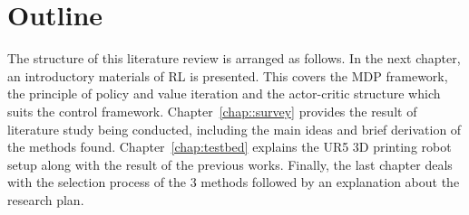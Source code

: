 \section{Outline}

The structure of this literature review is arranged as follows. In the next chapter, an introductory materials of \acs{RL} is presented. This covers the \ac{MDP} framework, the principle of policy and value iteration and the actor-critic structure which suits the control framework. Chapter~\ref{chap::survey} provides the result of literature study being conducted, including the main ideas and brief derivation of the methods found. Chapter~\ref{chap:testbed} explains the UR5 \acs{3D} printing robot setup along with the result of the previous works. Finally, the last chapter deals with the selection process of the 3 methods followed by an explanation about the research plan.  



